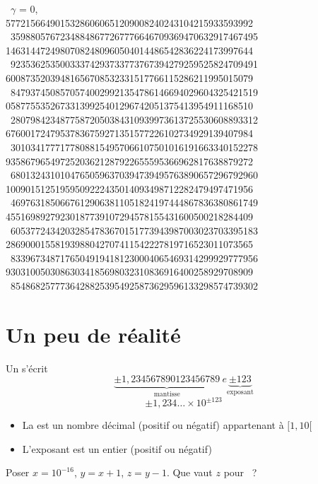 \begin{frame}
\begin{center}
{\footnotesize
\qquad \  $\gamma$ = 0,\hfill \hfill\  \\
  57721566490153286060651209008240243104215933593992 \ 35988057672348848677267776646709369470632917467495 \\
  14631447249807082480960504014486542836224173997644 \ 92353625350033374293733773767394279259525824709491 \\
  60087352039481656708532331517766115286211995015079 \ 84793745085705740029921354786146694029604325421519 \\
  05877553526733139925401296742051375413954911168510 \ 28079842348775872050384310939973613725530608893312 \\
  67600172479537836759271351577226102734929139407984 \ 30103417771778088154957066107501016191663340152278 \\
  93586796549725203621287922655595366962817638879272 \ 68013243101047650596370394739495763890657296792960 \\
  10090151251959509222435014093498712282479497471956 \ 46976318506676129063811051824197444867836380861749 \\
  45516989279230187739107294578155431600500218284409 \ 60537724342032854783670151773943987003023703395183 \\
  28690001558193988042707411542227819716523011073565 \ 83396734871765049194181230004065469314299929777956 \\
  93031005030863034185698032310836916400258929708909 \ 85486825777364288253954925873629596133298574739302\ \\
  }  
\end{center}
\end{frame}



\section{Un peu de réalité}



\begin{frame}
Un  s'écrit
$$\underbrace{\pm 1,234567890123456789}_{\text{mantisse}} \ e\underbrace{\pm 123}_{\text{exposant}}$$
\pause
$$\pm 1,234\ldots \times 10^{\pm 123}$$

\pause

\begin{itemize}
  \item La  est un nombre décimal (positif ou négatif) appartenant à $[1,10[$
\pause
  \item L'exposant est un entier (positif ou négatif)
\end{itemize}

\pause

\begin{tp}
Poser $x=10^{-16}$, $y=x+1$, $z=y-1$. Que vaut $z$ pour \Python \ ?
\end{tp}

\end{frame}


